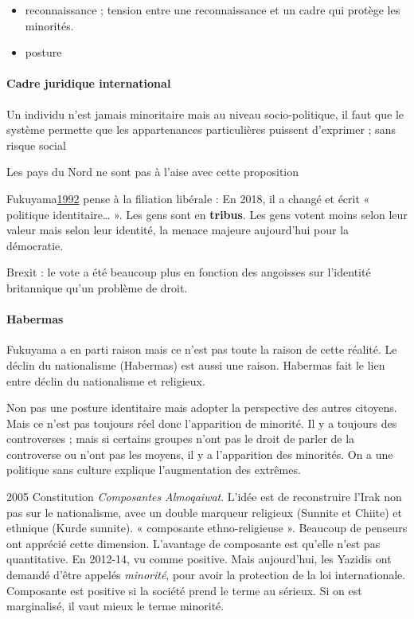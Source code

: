 \begin{itemize}
\item reconnaissance ; tension entre une reconnaissance et un cadre qui protège les minorités. 
\item posture
\end{itemize}

\paragraph{Cadre juridique international}

Un individu n’est jamais minoritaire mais au niveau socio-politique, il faut que le système permette que les appartenances particulières puissent d’exprimer ; sans risque social
\begin{Ex}
Les pays du Nord ne sont pas à l’aise avec cette proposition
\end{Ex}
Fukuyama\href{https://fr.wikipedia.org/wiki/La_Fin_de_l%27histoire_et_le_Dernier_Homme}{1992} pense à la filiation libérale  : \mn{1992 - la fin de l’histoire et le dernier homme } 
En 2018, il a changé et écrit « politique identitaire… ». Les gens sont en \textbf{tribus}. Les gens votent moins selon leur valeur mais selon leur identité, la menace majeure aujourd’hui pour la démocratie. 
\begin{Ex}
Brexit : le vote a été beaucoup plus en fonction des angoisses sur l’identité britannique qu’un problème de droit. 
\end{Ex}
\paragraph{Habermas}
Fukuyama a en parti raison mais ce n’est pas toute la raison de cette réalité. Le déclin du nationalisme (Habermas) est aussi une raison. Habermas fait le lien entre déclin du nationalisme et religieux. 

Non pas une posture identitaire mais adopter la perspective des autres citoyens. Mais ce n’est pas toujours réel donc l’apparition de minorité. Il y a toujours des controverses ; mais si certains groupes n’ont pas le droit de parler de la controverse ou n’ont pas les moyens, il y a l’apparition des minorités.
On a une politique sans culture explique l’augmentation des extrêmes. 

\begin{Ex}[Irak]
2005 Constitution
\textit{Composantes} \textit{Almoqaiwat}. 
L’idée est de reconstruire l’Irak non pas sur le nationalisme, avec un double marqueur religieux (Sunnite et Chiite) et ethnique (Kurde sunnite). « composante ethno-religieuse ».
Beaucoup de penseurs ont apprécié cette dimension. L’avantage de composante est qu’elle n’est pas quantitative.
En 2012-14, vu comme positive. Mais aujourd’hui, les Yazidis ont demandé d’être appelés \textit{minorité}, pour avoir la protection de la loi internationale. Composante est positive si la société prend le terme au sérieux. Si on est marginalisé, il vaut mieux le terme minorité. 
\end{Ex}
